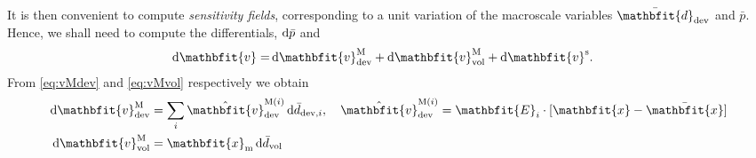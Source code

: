 \documentclass[10pt,a4paper]{article}
\renewcommand{\ta}[1]{\mathbfit{#1}}
\renewcommand{\ts}[1]{\mathbfit{#1}}
\begin{document}
It is then convenient to compute \emph{sensitivity fields}, corresponding to a unit variation of the macroscale variables $\bar{\ts d}_\dev$ and $\bar{p}$. Hence, we shall need to compute the differentials, $\operatorname{d \!}\bar p$ and
\begin{align}
    \dif\ta{v}
     = &
    \dif\ta{v}^\macro_\dev + \dif\ta{v}^\macro_\vol + \dif\ta{v}^\fluct.
\label{eq:dv}
\end{align}
From \eqref{eq:vMdev} and \eqref{eq:vMvol} respectively we obtain
\begin{align}
  \dif \ta{v}^{\macro}_\dev &= \sum_{i} \hat{\ta{v}}^{\macro(i)}_\dev \dif\bar{d}_{\dev,i}, \quad  \hat{\ta{v}}^{\macro(i)}_\dev = \ts E_i \cdot [\ta x - \bar{\ta x}]
    \label{eq216}\\
\dif\ta{v}^\macro_\vol &= \ta x_\mean \dif \bar{d}_\vol
\end{align}
\end{document}
